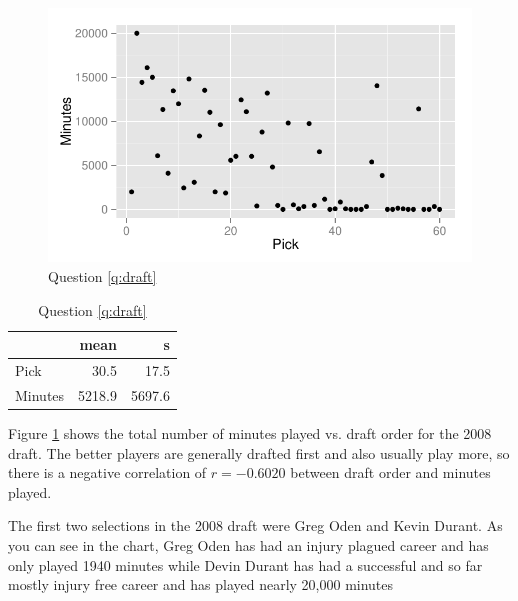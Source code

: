 \documentclass[letterpaper]{exam}
\begin{document}
\begin{questions}
        \begin{figure}[H]
          \centering
          \includegraphics[scale = 1]{figures/draft.pdf}
          \caption{Question \ref{q:draft}}
          \label{fig:draft}
        \end{figure}

        \begin{table}[H]
          \centering
          \begin{tabular}{lrr}
            \toprule
                     & mean   & s \\
            \midrule
            Pick     & 30.5   & 17.5 \\
            Minutes  & 5218.9 & 5697.6 \\
            \bottomrule
          \end{tabular}
          \caption{Question \ref{q:draft}}
        \end{table}

        Figure \ref{fig:draft} shows the total number of minutes played vs.  draft
        order for the 2008 draft.  The better players are generally drafted first
        and also usually play more, so there is a negative correlation of 
        $r = -0.6020$ between draft order and minutes played.

        The first two selections in the 2008 draft were Greg Oden and Kevin Durant.
        As you can see in the chart, Greg Oden has had an injury plagued career and
        has only played 1940 minutes while Devin Durant has had a successful and so
        far mostly injury free career and has played nearly 20,000 minutes

\end{questions}
\end{document}
